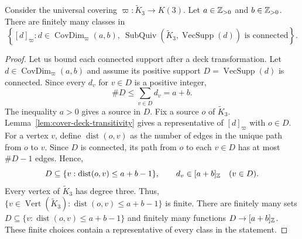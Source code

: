\begin{lemma}\label{lem:cover-trees-finite}
Consider the universal covering $\varpi:\widetilde K_3\to K(3)$.
Let $a\in\mathbb Z_{>0}$ and $b\in\mathbb Z_{>0}$.
There are finitely many classes in
\[
 \left\{[d]_{\varpi}:d\in\operatorname{CovDim}_{\varpi}(a,b),\
 \operatorname{SubQuiv}(\widetilde K_3,\operatorname{VecSupp}(d))
 \text{ is connected}\right\}.
\]
\end{lemma}
\begin{proof}
Let us bound each connected support after a deck transformation.
Let $d\in\operatorname{CovDim}_{\varpi}(a,b)$ and assume its positive support $D=\operatorname{VecSupp}(d)$ is connected.
Since every $d_v$ for $v\in D$ is a positive integer,
\[
 \#D\le\sum_{v\in D}d_v=a+b.
\]
The inequality $a>0$ gives a source in $D$.
Fix a source $o$ of $\widetilde K_3$.
Lemma~\ref{lem:cover-deck-transitivity} gives a representative of $[d]_{\varpi}$ with $o\in D$.
For a vertex $v$, define $\operatorname{dist}(o,v)$ as the number of edges in the unique path from $o$ to $v$.
Since $D$ is connected, its path from $o$ to each $v\in D$ has at most $\#D-1$ edges. Hence,
\[
 D\subseteq\{v:\operatorname{dist}(o,v)\le a+b-1\},\qquad
 d_v\in[a+b]_{\mathbb Z}\quad(v\in D).
\]
Every vertex of $\widetilde K_3$ has degree three.
Thus, $\{v\in\operatorname{Vert}(\widetilde K_3):\operatorname{dist}(o,v)\le a+b-1\}$ is finite.
There are finitely many sets $D\subseteq\{v:\operatorname{dist}(o,v)\le a+b-1\}$ and finitely many functions $D\to[a+b]_{\mathbb Z}$.
These finite choices contain a representative of every class in the statement.
\end{proof}

